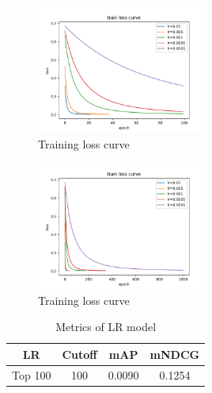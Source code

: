 \begin{figure}
    \centering
    \includegraphics[width=0.5\textwidth]{aseets/epochto100.png}
    \caption{Training loss curve}
    \label{fig:lr_100}
\end{figure}
\begin{figure}
    \centering
    \includegraphics[width=0.5\textwidth]{aseets/epochto1000.png}
    \caption{Training loss curve}
    \label{fig:lr_1000}
\end{figure}
\begin{table}[ht]
    \centering
    \caption{Metrics of LR model}
    \label{tab:lr_metrics}
    \begin{tabular}{|c|c|c|c|}
        \hline
        LR & Cutoff & mAP & mNDCG \\
        \hline
        Top 100 & 100 & 0.0090 & 0.1254 \\
        \hline
    \end{tabular}
\end{table}